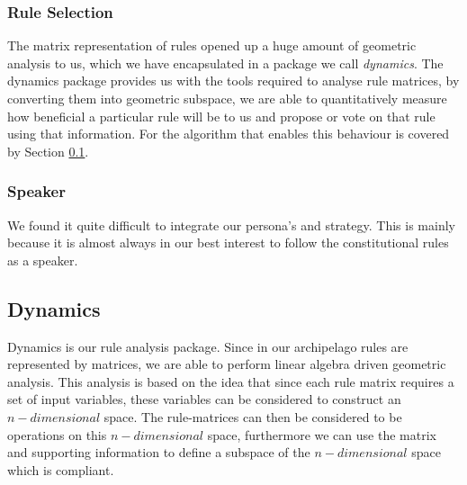 \documentclass{article}
\begin{document}
\subsubsection*{Rule Selection}
The matrix representation of rules opened up a huge amount of geometric analysis to us, which we have encapsulated in a package we call \emph{dynamics}. The dynamics package provides us with the tools required to analyse rule matrices, by converting them into geometric subspace, we are able to quantitatively measure how beneficial a particular rule will be to us and propose or vote on that rule using that information. For the algorithm that enables this behaviour is covered by Section \ref{dynamics}.


\subsubsection{Speaker}
We found it quite difficult to integrate our persona's and strategy. This is mainly because it is almost always in our best interest to follow the constitutional rules as a speaker.\\

\subsection{Dynamics}
\label{dynamics}
Dynamics is our rule analysis package. Since in our archipelago rules are represented by matrices, we are able to perform linear algebra driven geometric analysis. This analysis is based on the idea that since each rule matrix requires a set of input variables, these variables can be considered to construct an $n-dimensional$ space. The rule-matrices can then be considered to be operations on this $n-dimensional$ space, furthermore we can use the matrix and supporting information to define a subspace of the $n-dimensional$ space which is compliant. \\
\end{document}
